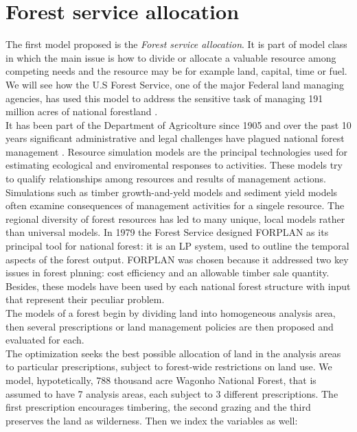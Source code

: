 \documentclass[a4paper,10 pt,titlepage,twoside]{report}
\theoremstyle{plain}
\theoremstyle{definition}
\theoremstyle{remark}
\begin{document}
{{\section{Forest service allocation} 
The first model proposed is the \textit{Forest service allocation}. It is part of model class in which the main issue is how to divide or allocate a valuable resource among competing needs and the resource may be for example land, capital, time or fuel. We will see how the U.S Forest Service, one of the major Federal land managing agencies, has used this model to address the sensitive task of managing 191 million acres of national forestland \cite{(Natural)}.\\
It has been part of the Department of Agricolture since 1905 and over the past 10 years significant administrative and legal challenges have plagued national forest management \cite{ForSer}. Resource simulation models are the principal technologies used for estimating ecological and enviromental responses to activities. These models try to qualify relationships among resources and results of management actions. Simulations such as timber growth-and-yeld models and sediment yield models often examine consequences of management activities for a singele resource. The regional diversity of forest resources has led to many unique, local models rather than universal models. In 1979 the Forest Service designed FORPLAN as its principal tool for national forest: it is an LP system, used to outline the temporal aspects of the forest output. FORPLAN was chosen because it addressed two key issues in forest plnning: cost efficiency and an allowable timber sale quantity. Besides, these models have been used by each national forest structure with input that represent their peculiar problem.\\
The models of a forest begin by dividing land into homogeneous analysis area, then several prescriptions or land management policies are then proposed and evaluated for each. \\The optimization seeks the best possible allocation of land in the analysis areas to particular prescriptions, subject to forest-wide restrictions on land use.
We model, hypotetically, 788 thousand acre Wagonho National Forest, that is assumed to have 7 analysis areas, each subject to 3 different prescriptions. The first prescription encourages timbering, the second grazing and the third preserves the land as wilderness. Then we index the variables as well:
\begin{itemize}

\end{itemize}}}
\end{document}
